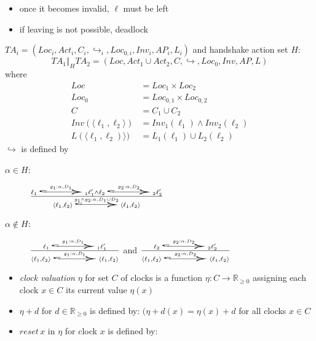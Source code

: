 \documentclass[a4paper, 10pt]{article}
\begin{document}
\begin{mdframed}
\begin{itemize}
    \begin{itemize}
        \item once it becomes invalid, $\ell$ must be left
        \item if leaving is not possible, deadlock
    \end{itemize}
\end{itemize}
$TA_i = (Loc_i,Act_i,C_i,\hookrightarrow_i,Loc_{0,i},Inv_i,AP_i,L_i)$ and handshake action set $H$:
\[ TA_1 \Vert_H TA_2= (Loc,Act_1\cup Act_2,C,\hookrightarrow,Loc_0,Inv,AP,L) \]
where
\begin{align*}
Loc   &= Loc_1\times Loc_2 \\
Loc_0 &= Loc_{0,1} \times Loc_{0,2} \\
C     &= C_1 \cup C_2 \\
Inv(\langle\ell_1,\ell_2\rangle) &= Inv_1(\ell_1) \wedge Inv_2(\ell_2) \\
L(\langle\ell_1,\ell_2)\rangle) &= L_1(\ell_1) \cup L_2(\ell_2)
\end{align*}
$\hookrightarrow$ is defined by
\begin{description}
    \item[$\alpha\in H$:] $\frac{
    \ell_1 \overset{g_1:\alpha, D_1}{\scalebox{5}[1]{$\hookrightarrow$}}_1 \ell'_1 \wedge \ell_2 \overset{g_2:\alpha, D_2}{\scalebox{5}[1]{$\hookrightarrow$}}_2 \ell'_2
    }{
    \langle\ell_1,\ell_2\rangle\overset{g_1\wedge g_2: \alpha, D_1\cup D_2}{\scalebox{5}[1]{$\hookrightarrow$}} \langle\ell_1,\ell_2\rangle
    }$
    \item[$\alpha\not\in H$:] $\frac{
    \ell_1 \overset{g_1:\alpha, D_1}{\scalebox{5}[1]{$\hookrightarrow$}}_1 \ell'_1
    }{
    \langle\ell_1,\ell_2\rangle\overset{g_1: \alpha, D_1}{\scalebox{5}[1]{$\hookrightarrow$}} \langle\ell_1,\ell_2\rangle
    }$
    and
    $\frac{
    \ell_2 \overset{g_2:\alpha, D_2}{\scalebox{5}[1]{$\hookrightarrow$}}_2 \ell'_2
    }{
    \langle\ell_1,\ell_2\rangle\overset{g_2: \alpha, D_2}{\scalebox{5}[1]{$\hookrightarrow$}} \langle\ell_1,\ell_2\rangle
    }$
\end{description}
\begin{itemize}
    \item \emph{clock valuation} $\eta$ for set $C$ of clocks is a function $\eta:C\to\mathds{R}_{\geq0}$ assigning each clock $x\in C$ its current value $\eta(x)$
    \item $\eta+d$ for $d\in\mathds{R}_{\geq0}$ is defined by: $(\eta+d(x)=\eta(x)+d$ for all clocks $x\in C$
    \item $reset\,x$ in $\eta$ for clock $x$ is defined by:

\end{itemize}
\end{mdframed}
\end{document}
